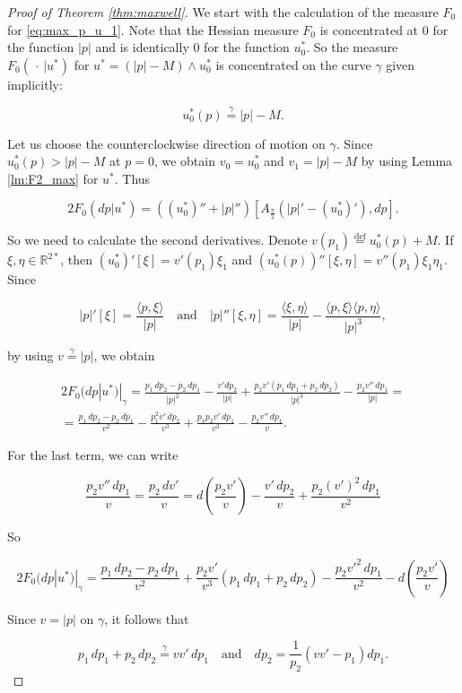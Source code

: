 \documentclass[14pt]{extarticle}
\newcommand{\R}{\mathbb{R}}
\newcommand{\eqdef}{\stackrel{\mathrm{def}}{=}}
\theoremstyle{remark}
\theoremstyle{definition}
\begin{document}
\begin{proof}[Proof of Theorem \ref{thm:maxwell}] We start with the calculation of the measure $F_0$ for \eqref{eq:max_p_u_1}. Note that the Hessian measure $F_0$ is concentrated at 0  for the function $|p|$ and is identically 0 for the function $u_0^*$. So the measure $F_0(\,\cdot\,|u^*)$ for $u^*=(|p|-M)\wedge u_0^*$ is concentrated on the curve $\gamma$ given implicitly:

\[
	u_0^*(p) \stackrel{\gamma}{=} |p|-M.
\]

Let us choose the counterclockwise direction of motion on $\gamma$. Since $u_0^*(p)>|p|-M$ at $p=0$, we obtain $v_0=u_0^*$ and $v_1=|p|-M$ by using Lemma \ref{lm:F2_max} for $u^*$. Thus 

\[
	2F_0(dp|u^*) = ((u_0^*)'' + |p|'')[A_{\frac\pi2}(|p|'-(u_0^*)'),dp].
\]

So we need to calculate the second derivatives. Denote $v(p_1)\eqdef u_0^*(p)+M$. If $\xi,\eta\in\R^{2*}$, then $(u^*_0)'[\xi]=v'(p_1)\xi_1$ and $(u_0^*(p))''[\xi,\eta] = v''(p_1)\xi_1\eta_1$. Since

\[
	|p|'[\xi] = \frac{\langle p,\xi\rangle}{|p|}
	\quad\mbox{and}\quad
	|p|''[\xi,\eta] = \frac{\langle \xi,\eta\rangle}{|p|} - 
	\frac{\langle p,\xi\rangle\langle p,\eta\rangle}{|p|^3},
\]

\noindent by using $v\stackrel{\gamma}{=}|p|$, we obtain

\begin{multline*}
	2F_0(dp|u^*)|_\gamma = \frac{p_1\,dp_2 - p_2\,dp_1}{|p|^2} - \frac{v'dp_2}{|p|}
	+\frac{p_2v'(p_1\,dp_1 + p_2\,dp_2)}{|p|^3} - \frac{p_2v''\,dp_1}{|p|} =\\
	=\frac{p_1\,dp_2 - p_2\,dp_1}{v^2}-\frac{p_1^2v'\,dp_2}{v^3} + 
	\frac{p_1p_2v'\,dp_1}{v^3}-\frac{p_2v''\,dp_1}{v}.
\end{multline*}

\noindent For the last term, we can write

\[
	\frac{p_2v''\,dp_1}{v} = \frac{p_2\,dv'}{v} = 
	d\left(\frac{p_2v'}{v}\right) - \frac{v'\,dp_2}{v} + \frac{p_2(v')^2\,dp_1}{v^2}
\]

\noindent So

\[
	2F_0(dp|u^*)|_\gamma = \frac{p_1\,dp_2 - p_2\,dp_1}{v^2} + \frac{p_2v'}{v^3}(p_1\,dp_1 + p_2\,dp_2) - \frac{p_2v'^2\,dp_1}{v^2} - d\left(\frac{p_2v'}{v}\right)
\]

Since $v=|p|$ on $\gamma$, it follows that

\[
	p_1\,dp_1 + p_2\,dp_2 \stackrel{\gamma}{=}vv'\,dp_1
	\quad\mbox{and}\quad
	dp_2 = \frac{1}{p_2}(vv' - p_1)dp_1.
\]


\end{proof}
\end{document}
